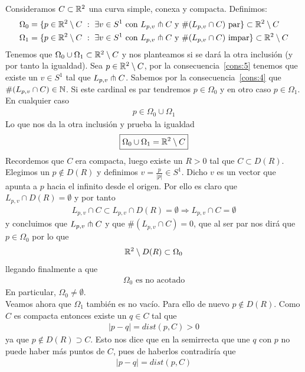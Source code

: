 Consideramos $C\subset \mathbb{R}^2$ una curva simple, conexa y compacta. Definimos:
\begin{align*}
    \Omega_0 &= \{p\in \mathbb{R}^2 \setminus C \ : \ \exists v \in S^1 \text{ con } L_{p,v}\pitchfork C \text{ y } \#(L_{p,v} \cap C) \text{ par}\} \subset \mathbb{R}^2 \setminus C\notag\\
    \Omega_1 &= \{p\in \mathbb{R}^2 \setminus C \ : \ \exists v \in S^1 \text{ con } L_{p,v}\pitchfork C \text{ y } \#(L_{p,v} \cap C) \text{ impar}\} \subset \mathbb{R}^2 \setminus C
\end{align*}
Tenemos que $\Omega_0 \cup \Omega_1 \subset \mathbb{R}^2 \setminus C$ y nos planteamos si se dará la otra inclusión (y por tanto la igualdad). Sea $p\in \mathbb{R}^2 \setminus C$, por la consecuencia~\ref{cons:5} tenemos que existe un $v\in S^1$ tal que $L_{p,v} \pitchfork C$. Sabemos por la consecuencia~\ref{cons:4} que $\#(L_{p,v}\cap C) \in \mathbb{N}$. Si este cardinal es par tendremos $p\in \Omega_0$ y en otro caso $p\in \Omega_1$. En cualquier caso
\begin{gather*}
    p\in \Omega_0\cup\Omega_1
\end{gather*}
Lo que nos da la otra inclusión y prueba la igualdad
\begin{gather*}
    \boxed{\Omega_0\cup\Omega_1 = \mathbb{R}^2 \setminus C}
\end{gather*}
Recordemos que $C$ era compacta, luego existe un $R>0$ tal que $C\subset D(R)$. Elegimos un $p\notin D(R)$ y definimos $v=\frac{p}{|p|}\in S^1$. Dicho $v$ es un vector que apunta a $p$ hacia el infinito desde el origen. Por ello es claro que $L_{p,v}\cap D(R) = \emptyset$ y por tanto
\begin{gather*}
    L_{p,v}\cap C \subset L_{p,v}\cap D(R) = \emptyset \Rightarrow L_{p,v}\cap C = \emptyset
\end{gather*}
y concluimos que $L_{p,v} \pitchfork C$ y que $\#(L_{p,v}\cap C)=0$, que al ser par nos dirá que $p\in \Omega_0$ por lo que 
\begin{gather*}
    \mathbb{R}^2 \setminus D(R)\subset \Omega_0
\end{gather*}
llegando finalmente a que 
\begin{gather*}
    \boxed{\Omega_0 \text{ es no acotado}}
\end{gather*}
En particular, $\boxed{\Omega_0\neq \emptyset}$.\\

Veamos ahora que $\Omega_1$ también es no vacío. Para ello de nuevo $p\notin D(R)$. Como $C$ es compacta entonces existe un $q\in C$ tal que 
\begin{gather*}
    |p-q| = dist(p,C) >0
\end{gather*}
ya que $p\notin D(R) \supset C$. Esto nos dice que en la semirrecta que une $q$ con $p$ no puede haber más puntos de $C$, pues de haberlos contradiría que 
\begin{gather*}
    |p-q| = dist(p,C)
\end{gather*}

